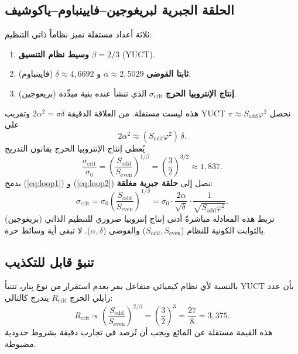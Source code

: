 \documentclass[12pt,a4paper]{article}
\begin{document}
	\subsection{الحلقة الجبرية لبريغوجين–فايينباوم–ياكوشيف}
	
	ثلاثة أعداد مستقلة تميز نظاماً ذاتي التنظيم:
	\begin{enumerate}
		\item \textbf{وسيط نظام التنسيق} \(\beta = 2/3\) (YUCT).
		\item \textbf{ثابتا الفوضى} \(\alpha \approx 2{,}5029\) و \(\delta \approx 4{,}6692\) (فايينباوم).
		\item \textbf{إنتاج الإنتروبيا الحرج} \(\sigma_{\mathrm{crit}}\) الذي تنشأ عنده بنية مبدِّدة (بريغوجين).
	\end{enumerate}
	هذه ليست مستقلة. من العلاقة الدقيقة \(2\alpha^2 = \pi\delta\) وتقريب YUCT \(\pi \approx S_{\mathrm{odd}}\varphi^2\) نحصل على
	\begin{equation}
		2\alpha^2 \approx (S_{\mathrm{odd}}\varphi^2)\,\delta .
		\label{eq:loop1}
	\end{equation}
	يُعطى إنتاج الإنتروبيا الحرج بقانون التدريج
	\begin{equation}
		\frac{\sigma_{\mathrm{crit}}}{\sigma_0} = \left( \frac{S_{\mathrm{odd}}}{S_{\mathrm{even}}} \right)^{1/\beta}
		= \left( \frac{3}{2} \right)^{3/2} \approx 1{,}837 .
		\label{eq:loop2}
	\end{equation}
	بدمج (\ref{eq:loop1}) و (\ref{eq:loop2}) نصل إلى \textbf{حلقة جبرية مغلقة}:
	\[
	\boxed{
		\sigma_{\mathrm{crit}} = \sigma_0 \left( \frac{S_{\mathrm{odd}}}{S_{\mathrm{even}}} \right)^{1/\beta}
		= \sigma_0 \cdot \frac{2\alpha}{\sqrt{\delta}} \cdot \frac{1}{\sqrt{S_{\mathrm{odd}}\varphi^2}} .
	}
	\]
	تربط هذه المعادلة مباشرةً أدنى إنتاج إنتروبيا ضروري للتنظيم الذاتي (بريغوجين) بالثوابت الكونية للنظام (\(S_{\mathrm{odd}},S_{\mathrm{even}}\)) والفوضى (\(\alpha,\delta\)). لا تبقى أية وسائط حرة.
	
	\subsection{تنبؤ قابل للتكذيب}
	
	بالنسبة لأي نظام كيميائي متفاعل يمر بعدم استقرار من نوع بِنار، تتنبأ YUCT بأن عدد رايلي الحرج \(R_{\mathrm{crit}}\) يتدرج كالتالي:
	\[
	R_{\mathrm{crit}} \propto \left( \frac{S_{\mathrm{odd}}}{S_{\mathrm{even}}} \right)^{2/\beta}
	= \left( \frac{3}{2} \right)^3 = \frac{27}{8} = 3{,}375 .
	\]
	هذه القيمة مستقلة عن المائع ويجب أن تُرصد في تجارب دقيقة بشروط حدودية مضبوطة.
	
\end{document}
